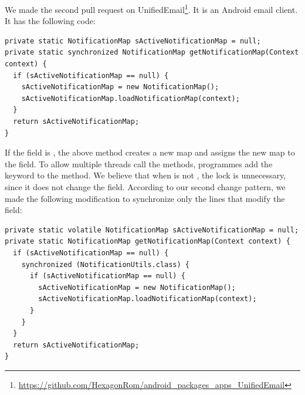 
We made the second pull request on UnifiedEmail\footnote{\url{https://github.com/HexagonRom/android_packages_apps_UnifiedEmail}}. It is an Android email client. It has the following code:

\begin{lstlisting}
private static NotificationMap sActiveNotificationMap = null;
private static synchronized NotificationMap getNotificationMap(Context context) {
  if (sActiveNotificationMap == null) {
    sActiveNotificationMap = new NotificationMap();
    sActiveNotificationMap.loadNotificationMap(context);
  }
  return sActiveNotificationMap;
}
\end{lstlisting}

If the  field is , the above method creates a new map and assigns the new map to the field. To allow multiple threads call the methods, programmes add the  keyword to the method. We believe that when  is not , the lock is unnecessary, since it does not change the field. According to our second change pattern, we made the following modification to synchronize only the lines that modify the field:

\begin{lstlisting}
private static volatile NotificationMap sActiveNotificationMap = null;
private static NotificationMap getNotificationMap(Context context) {
  if (sActiveNotificationMap == null) {
    synchronized (NotificationUtils.class) {
      if (sActiveNotificationMap == null) {
        sActiveNotificationMap = new NotificationMap();
        sActiveNotificationMap.loadNotificationMap(context);
      }
    }
  }
  return sActiveNotificationMap;
}
\end{lstlisting}

